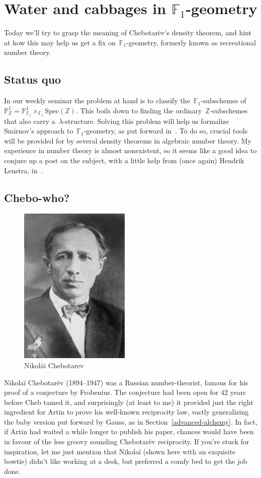 \section{Water and cabbages in \texorpdfstring{$\mathbb{F}_1$}{F-un}-geometry}
Today we'll try to grasp the meaning of Chebotar\"ev's density theorem, and hint at how this may help us get a fix on~$\mathbb{F}_{1}$-geometry, formerly known as recreational number theory.

\subsection{Status quo}

In our weekly seminar the problem at hand is to classify the~$\mathbb{F}_{1}$-subschemes of~$\mathbb{P}^{1}_{\mathbb{Z}}=\mathbb{P}^{1}_{\mathbb{F}_{1}}\times_{\mathbb{F}_{1}}\mathrm{Spec}(\mathbb{Z})$. This boils down to finding the ordinary~$\mathbb{Z}$-subschemes that also carry a~$\lambda$-structure. Solving this problem will help us formalize Smirnov's approach to~$\mathbb{F}_{1}$-geometry, as put forward in~\cite{hurwitz-inequalities-for-number-fields}. To do so, crucial tools will be provided for by several density theorems in algebraic number theory. My experience in number theory is almost nonexistent, so it seems like a good idea to conjure up a post on the subject, with a little help from (once again) Hendrik Lenstra, in~\cite{chebotarev-and-his-density-theorem}.

\subsection{Chebo-who?}
\begin{figure}
  \centering
  \includegraphics[width=.3\textwidth]{chebotarev-density/chebotarev}
  \caption{Nikol\"ai Chebotarev}
\end{figure}
Nikola\"i Chebotar\"ev (1894--1947) was a Russian number-theorist, famous for his proof of a conjecture by Frobenius. The conjecture had been open for 42 years before Cheb tamed it, and surprisingly (at least to me) it provided just the right ingredient for Artin to prove his well-known reciprocity law, vastly generalizing the baby version put forward by Gauss, as in Section~\ref{advanced-alchemy}. In fact, if Artin had waited a while longer to publish his paper, chances would have been in favour of the less groovy sounding Chebotar\"ev reciprocity. If you're stuck for inspiration, let me just mention that Nikola\"i (shown here with an exquisite bowtie) didn't like working at a desk, but preferred a comfy bed to get the job done.

